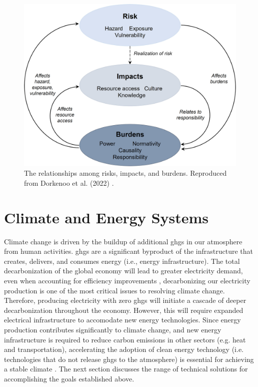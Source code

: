\begin{figure}
    \centering
    \includegraphics[width=\columnwidth]{figures/02_literature_review/dorkenoo-disproportionality.jpg}
    \caption{The relationships among risks, impacts, and burdens. Reproduced
    from Dorkenoo et al. (2022) \cite{dorkenoo_critical_2022}.}
    \label{fig:risk-impact-burden}
\end{figure}



\section{Climate and Energy Systems}

Climate change is driven by the buildup of additional \acp{ghg} in our
atmosphere from human activities. \acp{ghg} are a significant byproduct of the
infrastructure that creates, delivers, and consumes energy (i.e., energy
infrastructure). The total decarbonization of the global economy will lead to
greater electricity demand, even when accounting for efficiency improvements
\cite{national_academies_of_sciences_engineering_and_medicine_accelerating_2021,
mai_electrification_2018}, decarbonizing our electricity production is one of
the most critical issues to resolving climate change. Therefore, producing
electricity with zero \acp{ghg} will initiate a cascade of deeper
decarbonization throughout the economy. However, this will require expanded
electrical infrastructure to accomodate new energy technologies. Since energy
production contributes significantly to climate change, and new energy
infrastructure is required to reduce carbon emissions in other sectors (e.g.
heat and transportation), accelerating the adoption of clean energy technology
(i.e. technologies that do not release \acp{ghg} to the atmosphere) is essential
for achieving a stable climate \cite{roelfsema_taking_2020,
taylor_managing_2021}. The next section discusses the range of technical
solutions for accomplishing the goals established above.

